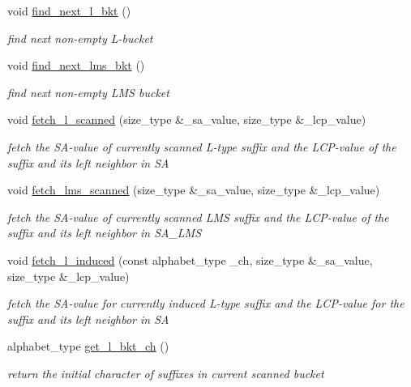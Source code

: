 \begin{DoxyCompactItemize}
void \hyperlink{struct_validate4_1_1_r_scan_a32f26034048e070455cd9b1f56c95b89}{find\+\_\+next\+\_\+l\+\_\+bkt} ()
\begin{DoxyCompactList}\small\item\em find next non-\/empty L-\/bucket \end{DoxyCompactList}\item 
void \hyperlink{struct_validate4_1_1_r_scan_af8a20c45983e2d175f6bbc67dcbef719}{find\+\_\+next\+\_\+lms\+\_\+bkt} ()
\begin{DoxyCompactList}\small\item\em find next non-\/empty L\+MS bucket \end{DoxyCompactList}\item 
void \hyperlink{struct_validate4_1_1_r_scan_af88a27e36780a6b390bc0bd18c253429}{fetch\+\_\+l\+\_\+scanned} (size\+\_\+type \&\+\_\+sa\+\_\+value, size\+\_\+type \&\+\_\+lcp\+\_\+value)
\begin{DoxyCompactList}\small\item\em fetch the S\+A-\/value of currently scanned L-\/type suffix and the L\+C\+P-\/value of the suffix and its left neighbor in SA \end{DoxyCompactList}\item 
void \hyperlink{struct_validate4_1_1_r_scan_aaeb8ae64faa2ab76d7467586f3281d97}{fetch\+\_\+lms\+\_\+scanned} (size\+\_\+type \&\+\_\+sa\+\_\+value, size\+\_\+type \&\+\_\+lcp\+\_\+value)
\begin{DoxyCompactList}\small\item\em fetch the S\+A-\/value of currently scanned L\+MS suffix and the L\+C\+P-\/value of the suffix and its left neighbor in S\+A\+\_\+\+L\+MS \end{DoxyCompactList}\item 
void \hyperlink{struct_validate4_1_1_r_scan_aaa6c6e347bff1c6cb663771646c41826}{fetch\+\_\+l\+\_\+induced} (const alphabet\+\_\+type \+\_\+ch, size\+\_\+type \&\+\_\+sa\+\_\+value, size\+\_\+type \&\+\_\+lcp\+\_\+value)
\begin{DoxyCompactList}\small\item\em fetch the S\+A-\/value for currently induced L-\/type suffix and the L\+C\+P-\/value for the suffix and its left neighbor in SA \end{DoxyCompactList}\item 
alphabet\+\_\+type \hyperlink{struct_validate4_1_1_r_scan_a8d691af43c806d0e3279c0121abf6ed7}{get\+\_\+l\+\_\+bkt\+\_\+ch} ()
\begin{DoxyCompactList}\small\item\em return the initial character of suffixes in current scanned bucket \end{DoxyCompactList}\item 

\end{DoxyCompactItemize}
